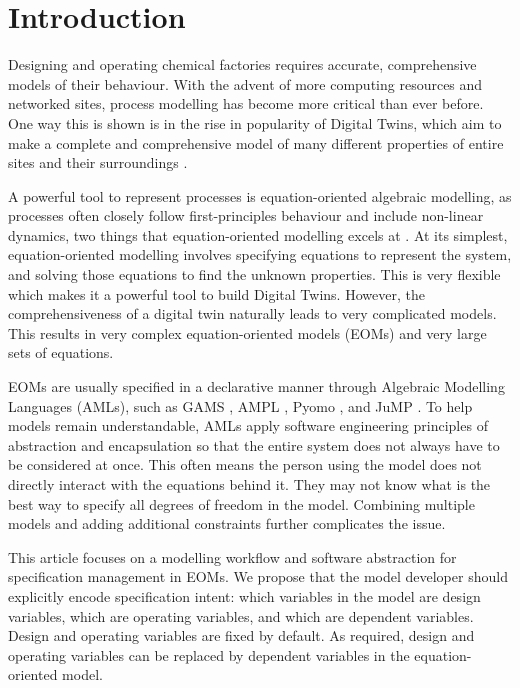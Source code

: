 \hypertarget{introduction}{%
\section{Introduction}\label{introduction}}

Designing and operating chemical factories requires accurate,
comprehensive models of their behaviour. With the advent of more
computing resources and networked sites, process modelling has become
more critical than ever before. One way this is shown is in the rise in
popularity of Digital Twins, which aim to make a complete and
comprehensive model of many different properties of entire sites and
their surroundings \citep{walmsley2024adaptive}. 

A powerful tool to represent processes is equation-oriented algebraic
modelling, as processes often closely follow first-principles behaviour
and include non-linear dynamics, two things that equation-oriented
modelling excels at \citep{shacham1982equation}. At its simplest,
equation-oriented modelling involves specifying equations to represent
the system, and solving those equations to find the unknown properties.
This is very flexible which makes it a powerful tool to build Digital Twins.
However, the comprehensiveness of a digital twin naturally leads to very complicated models.
This results in very complex equation-oriented models (EOMs) and very
large sets of equations.

EOMs are usually specified in a declarative manner through Algebraic
Modelling Languages (AMLs), such as GAMS \citep{robichaud2010introduction}, 
AMPL \citep{fourer1990ampl}, Pyomo \citep{hart2011pyomo}, and JuMP \citep{lubin2023jump}. To help models remain understandable,
AMLs apply software engineering principles of abstraction
and encapsulation so that the entire system does not always have to be
considered at once. This often means the person using the model does not
directly interact with the equations behind it. They may not
know what is the best way to specify all
degrees of freedom in the model. Combining multiple models and adding additional
constraints further complicates the issue.

This article focuses on a modelling workflow and software abstraction
for specification management in EOMs. We propose that the model developer should
explicitly encode specification intent: which variables in the model are
design variables, which are operating variables, and which are dependent
variables. Design and operating variables are fixed by default. As
required, design and operating variables can be replaced by dependent
variables in the equation-oriented model.

